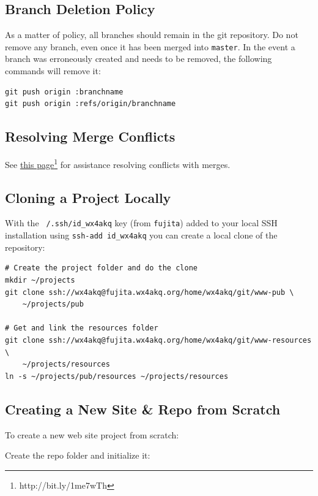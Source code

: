 \documentclass[pdflatex,letterpaper,twoside,12pt]{book}
\begin{document}
\subsection{Branch Deletion Policy}

As a matter of policy, all branches should remain in the git repository.  Do not remove any branch, even once it has been merged into \texttt{master}. In the event a branch was erroneously created and needs to be removed, the following commands will remove it:

\begin{verbatim}
git push origin :branchname
git push origin :refs/origin/branchname
\end{verbatim}

\subsection{Resolving Merge Conflicts}

See \href{http://bit.ly/1me7wTh}{this page}\footnote{http://bit.ly/1me7wTh} for assistance resolving conflicts with merges.

\subsection{Cloning a Project Locally}

With the \texttt{~/.ssh/id\_wx4akq} key (from \texttt{fujita}) added to your local SSH installation using \texttt{ssh-add id\_wx4akq} you can create a local clone of the repository:

\begin{verbatim}
# Create the project folder and do the clone
mkdir ~/projects
git clone ssh://wx4akq@fujita.wx4akq.org/home/wx4akq/git/www-pub \
	~/projects/pub

# Get and link the resources folder
git clone ssh://wx4akq@fujita.wx4akq.org/home/wx4akq/git/www-resources \
	~/projects/resources
ln -s ~/projects/pub/resources ~/projects/resources
\end{verbatim}

\subsection{Creating a New Site \& Repo from Scratch}

To create a new web site project from scratch:

Create the repo folder and initialize it:
\end{document}
